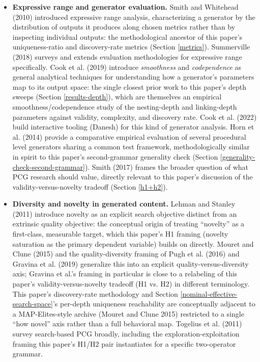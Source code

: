 \documentclass[]{article}
\begin{document}
\begin{itemize}
            \item
                \textbf{Expressive range and generator evaluation.} Smith and Whitehead (2010) introduced expressive range analysis, characterizing a generator by the distribution of outputs it produces along chosen metrics rather than by inspecting individual outputs: the methodological ancestor of this paper's uniqueness-ratio and discovery-rate metrics (Section \ref{metrics}). Summerville (2018) surveys and extends evaluation methodologies for expressive range specifically. Cook et al. (2019) introduce \textit{smoothness} and \textit{codependence} as general analytical techniques for understanding how a generator's parameters map to its output space: the single closest prior work to this paper's depth sweeps (Section \ref{results-depth}), which are themselves an empirical smoothness/codependence study of the nesting-depth and linking-depth parameters against validity, complexity, and discovery rate. Cook et al. (2022) build interactive tooling (Danesh) for this kind of generator analysis. Horn et al. (2014) provide a comparative empirical evaluation of several procedural level generators sharing a common test framework, methodologically similar in spirit to this paper's second-grammar generality check (Section \ref{generality-check-second-grammar}). Smith (2017) frames the broader question of what PCG research should value, directly relevant to this paper's discussion of the validity-versus-novelty tradeoff (Section \ref{h1+h2}).

            \item
                \textbf{Diversity and novelty in generated content.} Lehman and Stanley (2011) introduce novelty as an explicit search objective distinct from an extrinsic quality objective: the conceptual origin of treating ``novelty'' as a first-class, measurable target, which this paper's H1 framing (novelty saturation as the primary dependent variable) builds on directly. Mouret and Clune (2015) and the quality-diversity framing of Pugh et al. (2016) and Gravina et al. (2019) generalize this into an explicit quality-versus-diversity axis; Gravina et al.'s framing in particular is close to a relabeling of this paper's validity-versus-novelty tradeoff (H1 vs. H2) in different terminology. This paper's discovery-rate methodology and Section \ref{nominal-effective-search-space}'s per-depth uniqueness reachability are conceptually adjacent to a MAP-Elites-style archive (Mouret and Clune 2015) restricted to a single ``how novel'' axis rather than a full behavioral map. Togelius et al. (2011) survey search-based PCG broadly, including the exploration-exploitation framing this paper's H1/H2 pair instantiates for a specific two-operator grammar.


\end{itemize}
\end{document}

